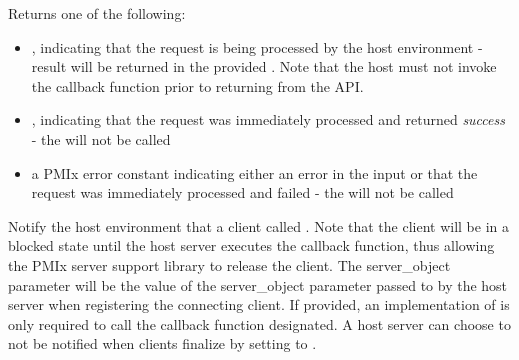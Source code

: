 \format


\begin{arglist}
\end{arglist}

Returns one of the following:

\begin{itemize}
    \item {}, indicating that the request is being processed by the host environment - result will be returned in the provided . Note that the host must not invoke the callback function prior to returning from the \ac{API}.
    \item {}, indicating that the request was immediately processed and returned \textit{success} - the  will not be called
    \item a PMIx error constant indicating either an error in the input or that the request was immediately processed and failed - the  will not be called
\end{itemize}

\descr

Notify the host environment that a client called .
Note that the client will be in a blocked state until the host server executes the callback function, thus allowing the PMIx server support library to release the client.
The server_object parameter will be the value of the server_object parameter passed to
 by the host server when registering the connecting client.  If provided, an implementation of 
is only required to
call the callback function designated.  A host server can choose to not be notified when clients finalize by setting  to .

